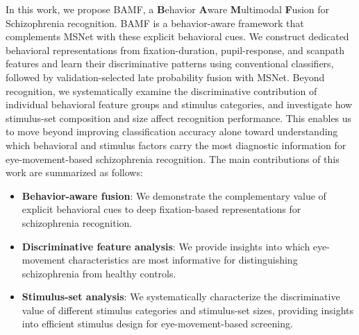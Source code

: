 \documentclass[conference,a4paper]{IEEEtran}
\begin{document}
In this work, we propose BAMF, a \textbf{B}ehavior \textbf{A}ware \textbf{M}ultimodal \textbf{F}usion for Schizophrenia recognition. BAMF is a behavior-aware framework that complements MSNet with these explicit behavioral cues. We construct dedicated behavioral representations from fixation-duration, pupil-response, and scanpath features and learn their discriminative patterns using conventional classifiers, followed by validation-selected late probability fusion with MSNet. Beyond recognition, we systematically examine the discriminative contribution of individual behavioral feature groups and stimulus categories, and investigate how stimulus-set composition and size affect recognition performance. This enables us to move beyond improving classification accuracy alone toward understanding which behavioral and stimulus factors carry the most diagnostic information for eye-movement-based schizophrenia recognition. The main contributions of this work are summarized as follows:
\begin{itemize}
    \item \textbf{Behavior-aware fusion}: We demonstrate the complementary value of explicit behavioral cues to deep fixation-based representations for schizophrenia recognition.
    \item \textbf{Discriminative feature analysis}: We provide insights into which eye-movement characteristics are most informative for distinguishing schizophrenia from healthy controls.
    \item \textbf{Stimulus-set analysis}: We systematically characterize the discriminative value of different stimulus categories and stimulus-set sizes, providing insights into efficient stimulus design for eye-movement-based screening.
\end{itemize}



\end{document}
